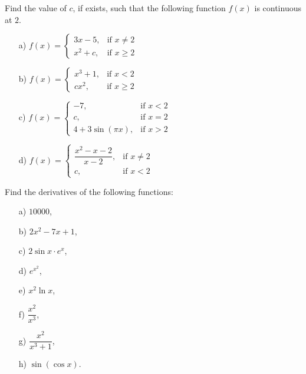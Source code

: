 \begin{problem}[2 points]
Find the value of $c$, if exists, such that the following function 
$f
(
x
)$ is continuous at 
$2$.
    \begin{enumerate}
    \item[a) ] $
f(x)=\begin{cases} 3x-5,& \text{if \(x\neq 2\)} \\  x^2+c,& \text{if \(x\ge2\)} \end{cases} $

        \item[b) ] $
f(x)=\begin{cases} x^3+1,& \text{if } x<2 \\  cx^2,& \text{if \(x\ge2\)} \end{cases} $ 
        
        \item[c) ] $
f(x)=\begin{cases} -7,& \text{if } x<2 \\ c,& \text{if } x=2 \\  4+3\sin(\pi x),& \text{if \(x>2\)} \end{cases} $
\bigskip
        
        \item[d) ] $
f(x)=\begin{cases} {\dfrac{x^2-x-2}{x-2}},& \text{if \(x\neq 2\)} \\  c,& \text{if \(x<2\)} \end{cases} $
        
    \end{enumerate}
\end{problem}
\bigskip


\begin{problem}[2 points]
Find the derivatives of the following functions:
    \begin{enumerate}
    \item[a) ] $10000$,

        \item[b) ] $2x^2-7x+1$,
        
        \item[c) ] $2\sin x \cdot e^x$,
        
        \item[d) ] $e^{x^2}$,
        \item[e) ] $x^2\ln x$,
        \item[f) ] $\dfrac{x^2}{x^3}$,
        \item[g) ] $\dfrac{x^2}{x^3+1}$,
        \item[h) ] $\sin(\cos x)$.
    \end{enumerate}
\end{problem}
\bigskip


